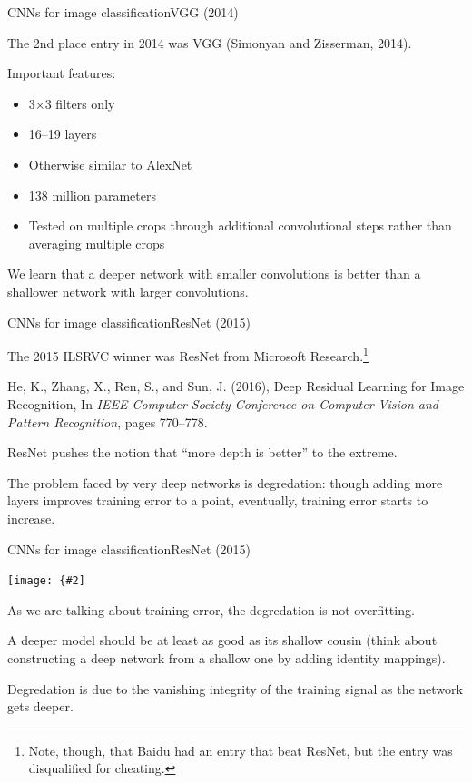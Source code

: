 \documentclass[aspectratio=169]{beamer}
\newcommand{\myfig}[3]{\centerline{\texttt{[image: \{\#2]}}}
\begin{document}
\begin{frame}{CNNs for image classification}{VGG (2014)}

  The 2nd place entry in 2014 was VGG (Simonyan and Zisserman, 2014).

  \medskip

  Important features:
  \begin{itemize}
  \item 3$\times$3 filters only
  \item 16--19 layers
  \item Otherwise similar to AlexNet
  \item 138 million parameters
  \item Tested on multiple crops through additional convolutional steps
    rather than averaging multiple crops
  \end{itemize}

  \medskip

  We learn that a deeper network with smaller convolutions is better
  than a shallower network with larger convolutions.

\end{frame}


\begin{frame}{CNNs for image classification}{ResNet (2015)}

  The 2015 ILSRVC winner was \alert{ResNet} from Microsoft
  Research.\footnote{Note, though, that Baidu had an entry that beat ResNet,
  but the entry was disqualified for cheating.}

  \medskip

  He, K., Zhang, X., Ren, S., and Sun, J. (2016), Deep Residual
  Learning for Image Recognition, In \textit{IEEE Computer Society
    Conference on Computer Vision and Pattern Recognition}, pages
  770--778.

  \medskip

  ResNet pushes the notion that ``more depth is better'' to the extreme.

  \medskip

  The problem faced by very deep networks is \alert{degredation}:
  though adding more layers improves training error to a point,
  eventually, training error starts to \alert{increase}.

\end{frame}


\begin{frame}{CNNs for image classification}{ResNet (2015)}

  \myfig{3.8in}{he-fig1}{He et al.\ (2016), Fig.\ 1}

  \medskip

  As we are talking about training error, the degredation is
  \alert{not overfitting}.

  \medskip

  A deeper model should be at least as good as its shallow cousin
  (think about constructing a deep network from a shallow one by
  adding identity mappings).

  \medskip
  
  Degredation is due to the vanishing integrity of the training signal
  as the network gets deeper.

\end{frame}
\end{document}
